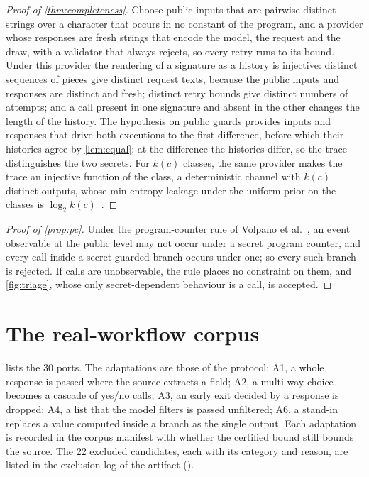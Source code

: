 \begin{proof}[Proof of \cref{thm:completeness}]
Choose public inputs that are pairwise distinct strings over a character that occurs in
no constant of the program, and a provider whose responses are fresh strings that encode
the model, the request and the draw, with a validator that always rejects, so every
retry runs to its bound. Under this provider the rendering of a signature as a history
is injective: distinct sequences of pieces give distinct request texts, because the
public inputs and responses are distinct and fresh; distinct retry bounds give distinct
numbers of attempts; and a call present in one signature and absent in the other changes
the length of the history. The hypothesis on public guards provides inputs and responses
that drive both executions to the first difference, before which their histories agree by
\cref{lem:equal}; at the difference the histories differ, so the trace distinguishes the
two secrets. For $k(c)$ classes, the same provider makes the trace an injective function
of the class, a deterministic channel with $k(c)$ distinct outputs, whose min-entropy
leakage under the uniform prior on the classes is $\log_2
k(c)$~\cite[Theorem 1]{smith2009foundations}.
\end{proof}

\begin{proof}[Proof of \cref{prop:pc}]
Under the program-counter rule of Volpano et al.~\cite{volpano1996sound}, an event
observable at the public level may not occur under a secret program counter, and every
call inside a secret-guarded branch occurs under one; so every such branch is rejected.
If calls are unobservable, the rule places no constraint on them, and \cref{fig:triage},
whose only secret-dependent behaviour is a call, is accepted.
\end{proof}

\section{The real-workflow corpus}\label{app:corpus}

 lists the 30 ports. The adaptations are those of the protocol: A1, a
whole response is passed where the source extracts a field; A2, a multi-way choice
becomes a cascade of yes/no calls; A3, an early exit decided by a response is dropped;
A4, a list that the model filters is passed unfiltered; A6, a stand-in replaces a value
computed inside a branch as the single output. Each adaptation is recorded in the
corpus manifest with whether the certified bound still bounds the source. The 22
excluded candidates, each with its category and reason, are listed in the exclusion log
of the artifact ().

